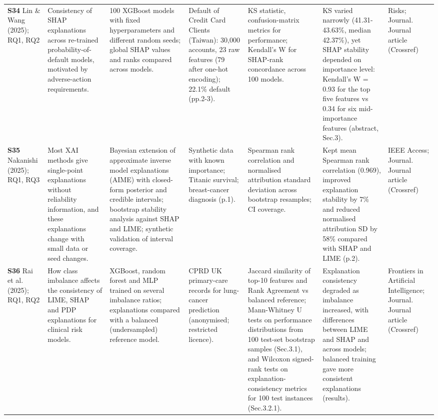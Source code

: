 \begin{longtable}{@{}P{1.55cm}P{2.9cm}P{4.5cm}P{3.2cm}P{3.4cm}P{4.6cm}P{3.6cm}@{}}
\textbf{S34} \cite{S34} Lin \& Wang (2025); RQ1, RQ2 & Consistency of SHAP explanations across re-trained probability-of-default models, motivated by adverse-action requirements. & 100 XGBoost models with fixed hyperparameters and different random seeds; global SHAP values and ranks compared across models. & Default of Credit Card Clients (Taiwan): 30,000 accounts, 23 raw features (79 after one-hot encoding); 22.1\% default (pp.2-3). & KS statistic, confusion-matrix metrics for performance; Kendall's W for SHAP-rank concordance across 100 models. & KS varied narrowly (41.31-43.63\%, median 42.37\%), yet SHAP stability depended on importance level: Kendall's W = 0.93 for the top five features vs 0.34 for six mid-importance features (abstract, Sec.3). & Risks; Journal. Journal article (Crossref) \\
\textbf{S35} \cite{S35} Nakanishi (2025); RQ1, RQ3 & Most XAI methods give single-point explanations without reliability information, and these explanations change with small data or seed changes. & Bayesian extension of approximate inverse model explanations (AIME) with closed-form posterior and credible intervals; bootstrap stability analysis against SHAP and LIME; synthetic validation of interval coverage. & Synthetic data with known importance; Titanic survival; breast-cancer diagnosis (p.1). & Spearman rank correlation and normalised attribution standard deviation across bootstrap resamples; CI coverage. & Kept mean Spearman rank correlation (0.969), improved explanation stability by 7\% and reduced normalised attribution SD by 58\% compared with SHAP and LIME (p.2). & IEEE Access; Journal. Journal article (Crossref) \\
\textbf{S36} \cite{S36} Rai et al. (2025); RQ1, RQ2 & How class imbalance affects the consistency of LIME, SHAP and PDP explanations for clinical risk models. & XGBoost, random forest and MLP trained on several imbalance ratios; explanations compared with a balanced (undersampled) reference model. & CPRD UK primary-care records for lung-cancer prediction (anonymised; restricted licence). & Jaccard similarity of top-10 features and Rank Agreement vs balanced reference; Mann-Whitney U tests on performance distributions from 100 test-set bootstrap samples (Sec.3.1), and Wilcoxon signed-rank tests on explanation-consistency metrics for 100 test instances (Sec.3.2.1). & Explanation consistency degraded as imbalance increased, with differences between LIME and SHAP and across models; balanced training gave more consistent explanations (results). & Frontiers in Artificial Intelligence; Journal. Journal article (Crossref) \\

\end{longtable}
